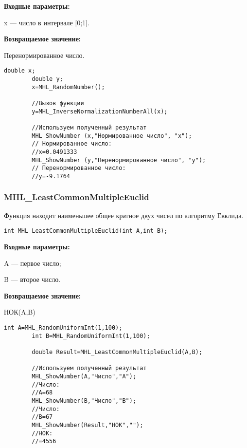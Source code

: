 \documentclass[a4paper,12pt]{article}
\begin{document}
\textbf{Входные параметры:}

 x --- число в интервале [0;1].

\textbf{Возвращаемое значение:}
 
Перенормированное число.


\begin{lstlisting}[label=code_use_MHL_InverseNormalizationNumberAll,caption=Пример использования]
        double x;
        double y;
        x=MHL_RandomNumber();

        //Вызов функции
        y=MHL_InverseNormalizationNumberAll(x);

        //Используем полученный результат
        MHL_ShowNumber (x,"Нормированное число", "x");
        // Нормированное число:
        //x=0.0491333
        MHL_ShowNumber (y,"Перенормированное число", "y");
        // Перенормированное число:
        //y=-9.1764
\end{lstlisting}

\subsubsection{MHL\_LeastCommonMultipleEuclid}\label{MHL_LeastCommonMultipleEuclid}

Функция находит наименьшее общее кратное двух чисел по алгоритму Евклида.


\begin{lstlisting}[label=code_syntax_MHL_LeastCommonMultipleEuclid,caption=Синтаксис]
int MHL_LeastCommonMultipleEuclid(int A,int B);
\end{lstlisting}

\textbf{Входные параметры:}  
 
A --- первое число;
 
B --- второе число.

\textbf{Возвращаемое значение:}
 
 НОК(A,B)


\begin{lstlisting}[label=code_use_MHL_LeastCommonMultipleEuclid,caption=Пример использования]
        int A=MHL_RandomUniformInt(1,100);
        int B=MHL_RandomUniformInt(1,100);

        double Result=MHL_LeastCommonMultipleEuclid(A,B);

        //Используем полученный результат
        MHL_ShowNumber(A,"Число","A");
        //Число:
        //A=68
        MHL_ShowNumber(B,"Число","B");
        //Число:
        //B=67
        MHL_ShowNumber(Result,"НОК","");
        //НОК:
        //=4556
\end{lstlisting}
\end{document}
